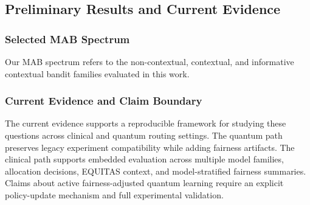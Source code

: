 \subsection{Preliminary Results and Current Evidence}

\subsubsection{Selected MAB Spectrum}
Our MAB spectrum refers to the non-contextual, contextual, and informative
contextual bandit families evaluated in this work.

\subsubsection{Current Evidence and Claim Boundary}
The current evidence supports a reproducible framework for studying these
questions across clinical and quantum routing settings. The quantum path
preserves legacy experiment compatibility while adding fairness artifacts. The
clinical path supports embedded evaluation across multiple model families,
allocation decisions, EQUITAS context, and model-stratified fairness summaries.
Claims about active fairness-adjusted quantum learning require an explicit
policy-update mechanism and full experimental validation.
